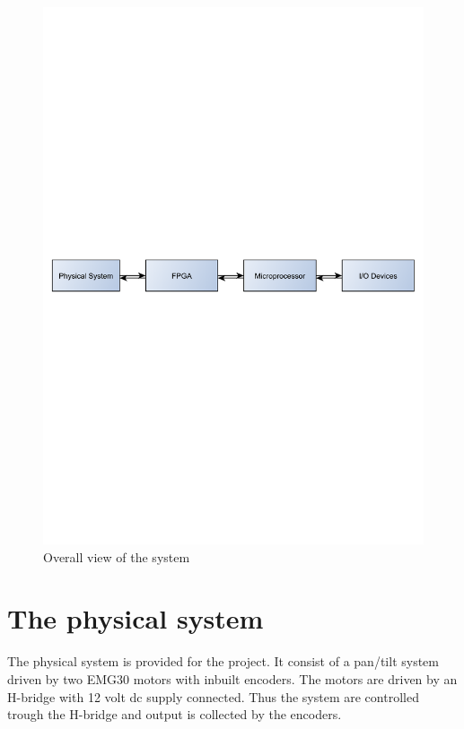 \begin{figure}[htb]
	\centering
	\includegraphics[scale=0.5,trim=400 400 400 400]{graphics/firstsystem} %
	\caption{Overall view of the system}
	\label{fig:firstsystem}			%
\end{figure}

\section{The physical system}\label{sec:phsycicalsystem}

The physical system is provided for the project. It consist of a pan/tilt system driven by two EMG30 \cite{emg30} motors with inbuilt encoders. The motors are driven by an H-bridge \cite{hbridge} with 12 volt dc supply connected. Thus the system are controlled trough the H-bridge and output is collected by the encoders.

